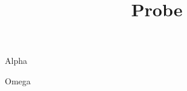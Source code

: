 \documentclass[11pt,aspectratio=169]{beamer}
\title{Probe}
\date{}
\begin{document}
\begin{frame}\raggedleft Alpha\par Omega\end{frame}
\end{document}
